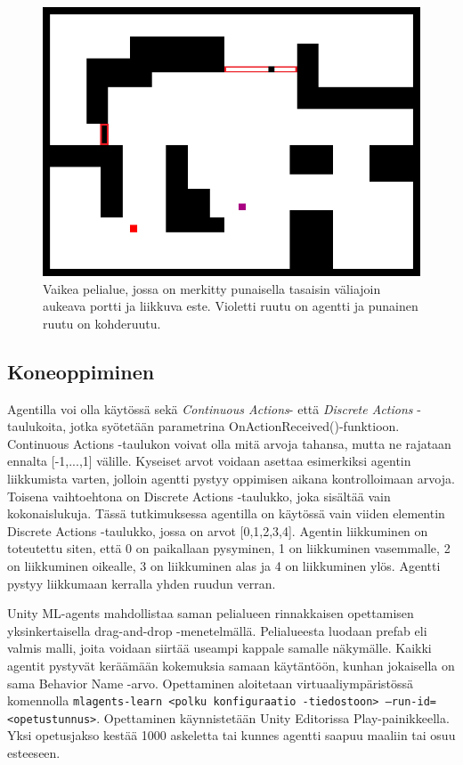 \documentclass[utf8]{gradu3}
\begin{document}
\begin{figure}[h]
\includegraphics[width=13cm]{area_difficult.png}
\centering
\caption{Vaikea pelialue, jossa on merkitty punaisella tasaisin väliajoin aukeava portti ja liikkuva este. Violetti ruutu on agentti ja punainen ruutu on kohderuutu.}
\label{areadifficult}
\end{figure}

\subsection{Koneoppiminen}
\label{koneoppiminenasetelma}

Agentilla voi olla käytössä sekä \textit{Continuous Actions}- että \textit{Discrete Actions} -taulukoita, jotka syötetään parametrina OnActionReceived()-funktioon. Continuous Actions -taulukon voivat olla mitä arvoja tahansa, mutta ne rajataan ennalta [-1,...,1] välille. Kyseiset arvot voidaan asettaa esimerkiksi agentin liikkumista varten, jolloin agentti pystyy oppimisen aikana kontrolloimaan arvoja. Toisena vaihtoehtona on Discrete Actions -taulukko, joka sisältää vain kokonaislukuja. Tässä tutkimuksessa agentilla on käytössä vain viiden elementin Discrete Actions -taulukko, jossa on arvot [0,1,2,3,4]. Agentin liikkuminen on toteutettu siten, että 0 on paikallaan pysyminen, 1 on liikkuminen vasemmalle, 2 on liikkuminen oikealle, 3 on liikkuminen alas ja 4 on liikkuminen ylös. Agentti pystyy liikkumaan kerralla yhden ruudun verran.

Unity ML-agents mahdollistaa saman pelialueen rinnakkaisen opettamisen yksinkertaisella drag-and-drop -menetelmällä. Pelialueesta luodaan prefab eli valmis malli, joita voidaan siirtää useampi kappale samalle näkymälle. Kaikki agentit pystyvät keräämään kokemuksia samaan käytäntöön, kunhan jokaisella on sama Behavior Name -arvo. Opettaminen aloitetaan virtuaaliympäristössä komennolla \texttt{mlagents-learn <polku konfiguraatio -tiedostoon> --run-id=<opetustunnus>}. Opettaminen käynnistetään Unity Editorissa Play-painikkeella. Yksi opetusjakso kestää 1000 askeletta tai kunnes agentti saapuu maaliin tai osuu esteeseen.
\end{document}
